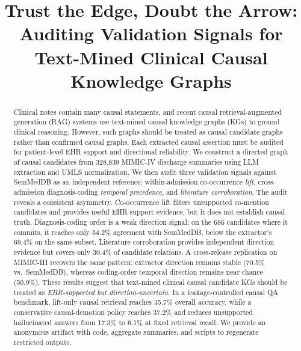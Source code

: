\documentclass[runningheads]{llncs}
\begin{document}
\title{Trust the Edge, Doubt the Arrow: Auditing Validation Signals for Text-Mined Clinical Causal Knowledge Graphs}

\author{}
\authorrunning{}
\institute{}

\maketitle

\begin{abstract}
Clinical notes contain many causal statements, and recent causal retrieval-augmented generation (RAG) systems use text-mined causal knowledge graphs (KGs) to ground clinical reasoning. However, such graphs should be treated as causal candidate graphs rather than confirmed causal graphs. Each extracted causal assertion must be audited for patient-level EHR support and directional reliability. We construct a directed graph of causal candidates from 328{,}839 MIMIC-IV discharge summaries using LLM extraction and UMLS normalization. We then audit three validation signals against SemMedDB as an independent reference: within-admission co-occurrence \emph{lift}, cross-admission diagnosis-coding \emph{temporal precedence}, and \emph{literature corroboration}. The audit reveals a consistent asymmetry. Co-occurrence lift filters unsupported co-mention candidates and provides useful EHR support evidence, but it does not establish causal truth. Diagnosis-coding order is a weak direction signal: on the 686 candidates where it commits, it reaches only 54.2\% agreement with SemMedDB, below the extractor's 69.4\% on the same subset. Literature corroboration provides independent direction evidence but covers only 30.4\% of candidate relations. A cross-release replication on MIMIC-III recovers the same pattern: extractor direction remains stable (70.5\% vs.\ SemMedDB), whereas coding-order temporal direction remains near chance (50.9\%). These results suggest that text-mined clinical causal candidate KGs should be treated as \emph{EHR-supported but direction-uncertain}. In a leakage-controlled causal QA benchmark, lift-only causal retrieval reaches 35.7\% overall accuracy, while a conservative causal-demotion policy reaches 37.2\% and reduces unsupported hallucinated answers from 17.3\% to 6.1\% at fixed retrieval recall. We provide an anonymous artifact with code, aggregate summaries, and scripts to regenerate restricted outputs.


\end{abstract}
\end{document}
